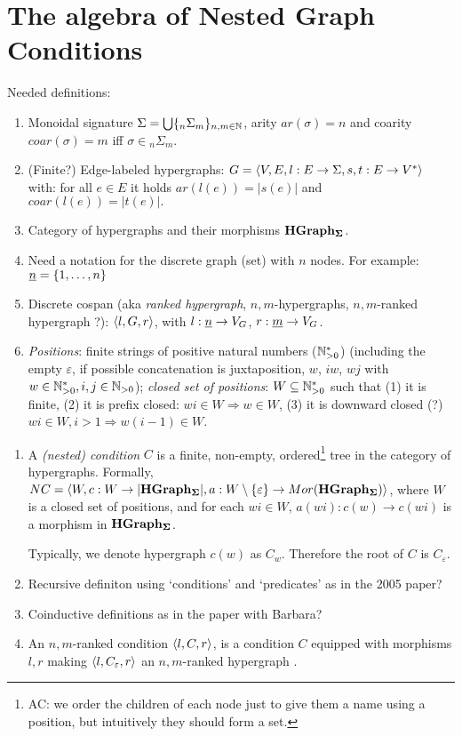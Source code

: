 \section{The algebra of Nested Graph Conditions}

Needed definitions:
\begin{enumerate}
  \item Monoidal signature $\Sigma = \bigcup\{_n\Sigma_m\}_{n,m \in \mathbb{N}}$, arity $ar(\sigma) = n$ and coarity $coar(\sigma)=m$ iff $\sigma \in {_n\Sigma_m}$.
  \item (Finite?) Edge-labeled hypergraphs: $G =\langle V,E,l:E \to \Sigma, s,t:E \to V^*\rangle$ with: for all $e\in E$ it holds $ar(l(e)) = |s(e)|$ and $coar(l(e)) = |t(e)|.$
  \item Category of hypergraphs and their morphisms ${\mathbf{HGraph_{\Sigma}}}$. 
  \item Need a notation for the discrete graph (set) with $n$ nodes. For example: 
  $\underline{n} = \{1,\ldots, n\}$
  \item Discrete cospan (aka \emph{ranked hypergraph}, $n,m$-hypergraphs, $n,m$-ranked hypergraph ?): $\langle l,G,r\rangle$, with $l:\underline{n} \to V_G$, $r:\underline{m} \to V_G$.
  \item \emph{Positions}: finite strings of positive natural numbers (${\mathbb{N}_{>0}^*}$) (including the empty $\varepsilon$, if possible concatenation is juxtaposition, $w$, $iw$, $wj$ with $w \in {\mathbb{N}_{>0}^*}, i,j \in \mathbb{N}_{>0}$); \emph{closed set of positions}: $W \subseteq {\mathbb{N}_{>0}^*}$ such that (1) it is finite, (2) it is prefix closed: $wi \in W \Rightarrow w \in W$, (3) it is downward closed (?)  $wi \in W, i > 1 \Rightarrow w(i-1) \in W$. 
\end{enumerate}  


\begin{definition}
  \begin{enumerate}
    \item
    A \emph{(nested) condition} $C$ is a finite, non-empty, ordered\footnote{AC: we order the children of each node just to give them a name using a position, but intuitively they should form a set.} tree in the category of hypergraphs. 
    Formally, $NC = \langle W, c:W \to |{\mathbf{HGraph_{\Sigma}}}|, a:W\setminus\{\varepsilon\} \to Mor({\mathbf{HGraph_{\Sigma}}})\rangle$, where $W$ is a closed set of positions, and for each $wi \in W$, $a(wi): c(w) \to c(wi)$ is a morphism in  ${\mathbf{HGraph_{\Sigma}}}$. 

    Typically, we denote hypergraph $c(w)$ as $C_w$. Therefore the root of $C$ is $C_{\varepsilon}$.
    \item Recursive definiton using `conditions' and `predicates' as in the 2005 paper?
    \item Coinductive definitions as in the paper with Barbara? 
    \item An $n,m$-ranked condition $\langle l,C,r\rangle$, is a condition $C$ equipped with morphisms $l,r$ making $\langle l,C_{\varepsilon},r\rangle$  an $n,m$-ranked hypergraph .
  \end{enumerate}
\end{definition}

